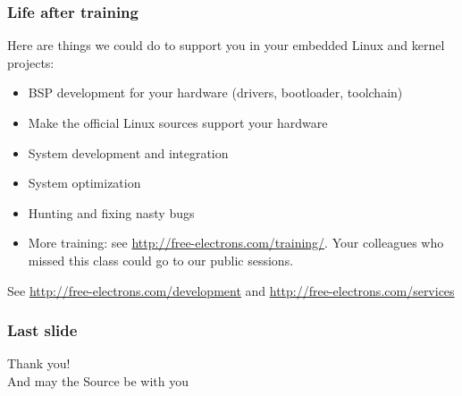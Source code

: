 \begin{frame}
  \frametitle{Life after training} Here are things we could do to
  support you in your embedded Linux and kernel projects:
  \begin{itemize}
  \item BSP development for your hardware (drivers, bootloader,
    toolchain)
  \item Make the official Linux sources support your hardware
  \item System development and integration
  \item System optimization
  \item Hunting and fixing nasty bugs
  \item More training: see
    \url{http://free-electrons.com/training/}. Your colleagues who
    missed this class could go to our public sessions.
  \end{itemize}
  See \url{http://free-electrons.com/development} and
  \url{http://free-electrons.com/services}
\end{frame}

\begin{frame}
  \frametitle{Last slide}
  \begin{center}
    \Huge
    Thank you!\\
    \huge
    And may the Source be with you\\
  \end{center}
\end{frame}
